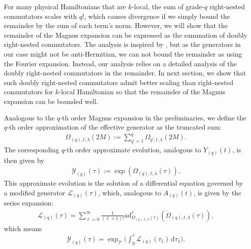 \documentclass[11pt]{article}
\renewcommand{\d}{\mathrm{d}}
\renewcommand{\L}{\mathcal{L}}
\newcommand{\ad}{\mathrm{ad}}
\newcommand{\mc}{\mathcal}
\begin{document}
For many physical Hamiltonians that are $k$-local, the sum of grade-$q$ right-nested commutators scales with $q!$, which causes divergence if we simply bound the remainder by the sum of each term's norm. However, we will show that the remainder of the Magnus expansion can be expressed as the summation of doubly right-nested commutators. The analysis is inspired by \citet{fang2025high}, but as the generators in our case might not be anti-Hermitian, we can not bound the remainder as \cite[Lemma~6]{fang2025high} using the Fourier expansion. Instead, our analysis relies on a detailed analysis of the doubly right-nested commutators in the remainder. In next section, we show that such doubly right-nested commutators admit better scaling than right-nested commutators for $k$-local Hamiltonian so that the remainder of the Magnus expansion can be bounded well. 

Analogous to the $q$-th order Magnus expansion in the preliminaries, we define the $q$-th order approximation of the effective generator as the truncated sum:
\begin{align*}
    \Omega_{(q),t,\lambda}(2M) := \sum_{q'=1}^{q} \Omega_{q',t,\lambda}(2M).
\end{align*}
The corresponding $q$-th order approximate evolution, analogous to $Y_{(q)}(t)$, is then given by
\begin{align*}
    \mc Y_{(q)}(\tau):=\exp\left( \Omega_{(q),t,\lambda}(\tau) \right).
\end{align*}
This approximate evolution is the solution of a differential equation governed by a modified generator $\L_{(q)}(\tau)$, which, analogous to $A_{(q)}(t) $, is given by the series expansion:
\begin{align*}
    \L_{(q)}(\tau) = \sum_{\ell = 0}^{\infty}\frac{1}{(\ell+1)!}\ad_{\Omega_{(q),t,\lambda}(\tau)}^\ell(\dot{\Omega}_{(q),t,\lambda}(\tau)),
\end{align*}
which means \begin{align*}
    \mc Y_{(q)}(\tau) = \exp_{\mc T}\bigg(\int_{0}^{\tau} \mc L_{(q)} (\tau_1) \, \d \tau_1 \bigg).
\end{align*}
\end{document}

